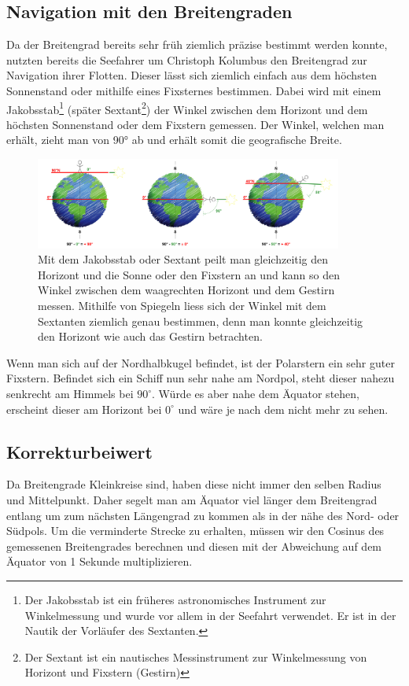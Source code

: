 \begin{refsection}
\subsection{Navigation mit den Breitengraden}  \label{BreitengradM}
Da der Breitengrad bereits sehr früh ziemlich präzise bestimmt werden konnte, nutzten bereits die Seefahrer um Christoph Kolumbus den Breitengrad zur Navigation ihrer Flotten.
Dieser lässt sich ziemlich einfach aus dem höchsten Sonnenstand oder mithilfe eines Fixsternes bestimmen. Dabei wird mit einem Jakobsstab\footnote{%
Der Jakobsstab ist ein früheres astronomisches Instrument zur Winkelmessung und wurde vor allem in der Seefahrt verwendet. Er ist in der Nautik der Vorläufer des Sextanten.} (später Sextant\footnote{%
Der Sextant ist ein nautisches Messinstrument zur Winkelmessung von Horizont und Fixstern (Gestirn)}) der Winkel zwischen dem Horizont und dem höchsten Sonnenstand oder dem Fixstern gemessen. Der Winkel, welchen man erhält, zieht man von 90° ab und erhält somit die geografische Breite. 

\begin{figure}[htbp]
\centering
\includegraphics[width=0.9\textwidth]{kugel/Breitengrad.jpg}
\caption{Mit dem Jakobsstab oder Sextant peilt man gleichzeitig den Horizont und die Sonne oder den Fixstern an und kann so den Winkel zwischen dem waagrechten Horizont und dem Gestirn messen. Mithilfe von Spiegeln liess sich der Winkel mit dem Sextanten ziemlich genau bestimmen, denn man konnte gleichzeitig den Horizont wie auch das Gestirn betrachten.}
\end{figure}

Wenn man sich auf der Nordhalbkugel befindet, ist der Polarstern ein sehr guter Fixstern. Befindet sich ein Schiff nun sehr nahe am Nordpol, steht dieser nahezu senkrecht am Himmels bei $90^{\circ}$. Würde es aber nahe dem Äquator stehen, erscheint dieser am Horizont bei $0^{\circ}$ und wäre je nach dem nicht mehr zu sehen.


\subsection{Korrekturbeiwert}
Da Breitengrade Kleinkreise sind, haben diese nicht immer den selben Radius und Mittelpunkt. Daher segelt man am Äquator viel länger dem Breitengrad entlang um zum nächsten Längengrad zu kommen als in der nähe des Nord- oder Südpols.
Um die verminderte Strecke zu erhalten, müssen wir den Cosinus des gemessenen Breitengrades berechnen und diesen mit der Abweichung auf dem Äquator von 1 Sekunde multiplizieren.


\end{refsection}
